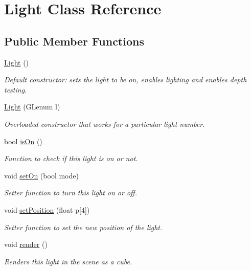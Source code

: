 \hypertarget{classLight}{\section{Light Class Reference}
\label{classLight}
}
\subsection*{Public Member Functions}
\begin{DoxyCompactItemize}
\item 
\hypertarget{classLight_aeb5df09a25a32f19fdffa761268ba24f}{\hyperlink{classLight_aeb5df09a25a32f19fdffa761268ba24f}{Light} ()}\label{classLight_aeb5df09a25a32f19fdffa761268ba24f}

\begin{DoxyCompactList}\small\item\em Default constructor\-: sets the light to be on, enables lighting and enables depth testing. \end{DoxyCompactList}\item 
\hyperlink{classLight_ac16c9370e7aadf9235d1595ef99193cf}{Light} (G\-Lenum l)
\begin{DoxyCompactList}\small\item\em Overloaded constructor that works for a particular light number. \end{DoxyCompactList}\item 
bool \hyperlink{classLight_a0d9e845ce87ee76224a2bf3ce419b3b0}{is\-On} ()
\begin{DoxyCompactList}\small\item\em Function to check if this light is on or not. \end{DoxyCompactList}\item 
void \hyperlink{classLight_a3b7fc0582048795fdd680879cd968c17}{set\-On} (bool mode)
\begin{DoxyCompactList}\small\item\em Setter function to turn this light on or off. \end{DoxyCompactList}\item 
void \hyperlink{classLight_a308afba16046a992631b719ef958bc64}{set\-Position} (float p\mbox{[}4\mbox{]})
\begin{DoxyCompactList}\small\item\em Setter function to set the new position of the light. \end{DoxyCompactList}\item 
void \hyperlink{classLight_a079892de32d6fbbbb3263856e86a9744}{render} ()
\begin{DoxyCompactList}\small\item\em Renders this light in the scene as a cube. \end{DoxyCompactList}\end{DoxyCompactItemize}


